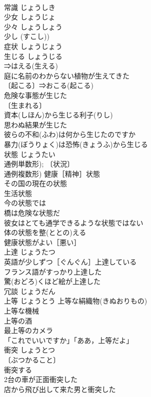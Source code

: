 \documentclass[8pt]{extreport}
\begin{document}
\begin{CJK}{UTF8}{min}
\\	常識	じょうしき	
\\	少女	しょうじょ	
\\	少々	しょうしょう	
\\	少し (すこし))
\\	症状	しょうじょう	
\\	生じる	しょうじる	
\\	⇒はえる(生える)　
\\	庭に名前のわからない植物が生えてきた 
\\	〔起こる〕⇒おこる(起こる)　
\\	危険な事態が生じた　 
\\	〔生まれる〕　 
\\	資本(しほん)から生じる利子(りし) 
\\	思わぬ結果が生じた 
\\	彼らの不和(ふわ)は何から生じたのですか 
\\	暴力(ぼうりょく)は恐怖(きょうふ)から生じる 
\\	状態	じょうたい	
\\	通例単数形); 〔状況〕
\\	通例複数形) 健康［精神］状態 
\\	その国の現在の状態 
\\	生活状態 
\\	今の状態では 
\\	橋は危険な状態だ 
\\	彼女はとても通学できるような状態ではない 
\\	体の状態を整(ととの)える 
\\	健康状態がよい［悪い］ 
\\	上達	じょうたつ	
\\	英語が少しずつ［ぐんぐん］上達している 
\\	フランス語がすっかり上達した 
\\	驚(おどろ)くほど絵が上達した 
\\	冗談	じょうだん	
\\	上等	じょうとう	上等な絹織物(きぬおりもの) 
\\	上等な機械 
\\	上等の酒 
\\	最上等のカメラ 
\\	「これでいいですか」「ああ，上等だよ」 
\\	衝突	しょうとつ	
\\	〔ぶつかること〕
\\	衝突する 
\\	2台の車が正面衝突した 
\\	店から飛び出して来た男と衝突した 

\end{CJK}
\end{document}

